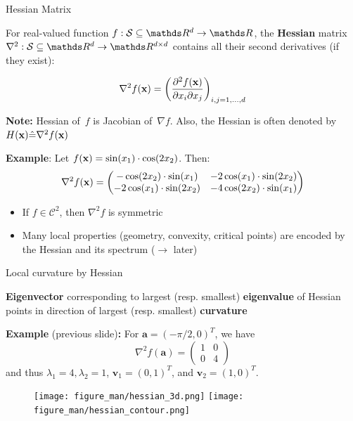 \documentclass[11pt,compress,t,notes=noshow, xcolor=table]{beamer}
\begin{document}
\begin{vbframe}{Hessian Matrix}

For real-valued function $f:\mathcal{S}\subseteq \R^d \to \R$, the \textbf{Hessian} matrix $\nabla^2:\mathcal{S}\subseteq \R^d \to \R^{d \times d}$ contains all their second derivatives (if they exist):

\begin{equation*}
\nabla^2 f(\mathbf{x}) = \left(\frac{\partial^2 f(\mathbf{x})}{\partial x_i \partial x_j}\right)_{i,j=1,\ldots,d}
\end{equation*}

\medskip

\textbf{Note:} Hessian of~$f$ is Jacobian of~$\nabla f$. Also, the Hessian is often denoted by $H(\mathbf{x})\hat{=}\nabla^2 f(\mathbf{x})$
\medskip

\textbf{Example}: Let $f(\mathbf{x}) = \sin(x_1) \cdot \cos(2x_2)$.
Then:
\begin{equation*}
    \nabla^2 f(\mathbf{x}) = \begin{pmatrix}
        -\cos(2x_2)\cdot\sin(x_1) & -2\cos(x_1)\cdot\sin(2x_2) \\
        -2\cos(x_1)\cdot\sin(2x_2) & -4\cos(2x_2)\cdot\sin(x_1)
    \end{pmatrix}
\end{equation*}

\begin{itemize}
    \item If $f\in\mathcal{C}^2$, then $\nabla^2 f$ is symmetric
    \item Many local properties (geometry, convexity, critical points) are encoded by the Hessian and its spectrum ($\rightarrow$ later)
\end{itemize}

\end{vbframe}


\begin{vbframe}{Local curvature by Hessian}

\textbf{Eigenvector} corresponding to largest (resp. smallest) \textbf{eigenvalue} of Hessian points in direction of largest (resp. smallest) \textbf{curvature}

\lz

\textbf{Example} (previous slide)\textbf{:}
For $\bm{a}=(-\pi/2,0)^T$, we have
\begin{equation*}
    \nabla^2 f(\bm{a}) = \begin{pmatrix}
        1 & 0 \\ 0 & 4
    \end{pmatrix}
\end{equation*}
and thus $\lambda_{1}=4, \lambda_{2}=1$, $\bm{v}_{1}=(0, 1)^T$, and $\bm{v}_{2}=(1, 0)^T$.

\begin{figure}
    \texttt{[image: figure\_man/hessian\_3d.png]}
    \hspace{0.5cm}
    \texttt{[image: figure\_man/hessian\_contour.png]}
\end{figure}

\end{vbframe}
\end{document}
